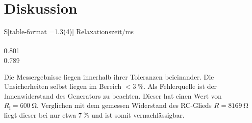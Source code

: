\section{Diskussion}
\label{sec:Diskussion}
\begin{table}[H]
  \centering
  \begin{tabular}{S[table-format =1.3(4)]}
    \toprule
    {Relaxationszeit/\si{\milli\second}}\\
     \\
    0.801 \\
    0.789\\
    \bottomrule
  \end{tabular}
\end{table}
\noindent
Die Messergebnisse liegen innerhalb ihrer Toleranzen beieinander. Die Unsicherheiten selbst liegen im Bereich $<\SI{3}{\percent}$.
Als Fehlerquelle ist der Innenwiderstand des Generators zu beachten. Dieser hat einen Wert von $R_\text{i} = \SI{600}{\ohm}$. Verglichen mit dem gemessen Widerstand des RC-Glieds $R=\SI{8169}{\ohm}$ liegt dieser bei nur etwa $\SI{7}{\percent}$ und ist somit vernachlässigbar.
